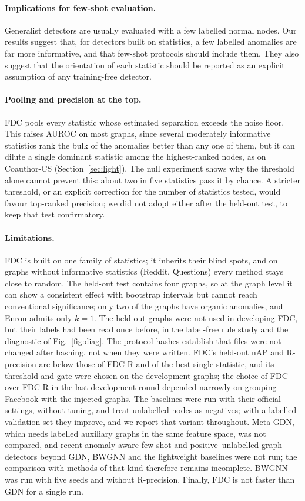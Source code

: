 \documentclass[pdflatex,sn-mathphys-ay]{sn-jnl}
\theoremstyle{plain}
\theoremstyle{remark}
\begin{document}
\paragraph{Implications for few-shot evaluation.} Generalist detectors are usually evaluated with a few labelled normal nodes. Our results suggest that, for detectors built on statistics, a few labelled anomalies are far more informative, and that few-shot protocols should include them. They also suggest that the orientation of each statistic should be reported as an explicit assumption of any training-free detector.

\paragraph{Pooling and precision at the top.} FDC pools every statistic whose estimated separation exceeds the noise floor. This raises AUROC on most graphs, since several moderately informative statistics rank the bulk of the anomalies better than any one of them, but it can dilute a single dominant statistic among the highest-ranked nodes, as on Coauthor-CS (Section~\ref{sec:light}). The null experiment shows why the threshold alone cannot prevent this: about two in five statistics pass it by chance. A stricter threshold, or an explicit correction for the number of statistics tested, would favour top-ranked precision; we did not adopt either after the held-out test, to keep that test confirmatory.

\paragraph{Limitations.} FDC is built on one family of statistics; it inherits their blind spots, and on graphs without informative statistics (Reddit, Questions) every method stays close to random. The held-out test contains four graphs, so at the graph level it can show a consistent effect with bootstrap intervals but cannot reach conventional significance; only two of the graphs have organic anomalies, and Enron admits only $k=1$. The held-out graphs were not used in developing FDC, but their labels had been read once before, in the label-free rule study and the diagnostic of Fig.~\ref{fig:diag}. The protocol hashes establish that files were not changed after hashing, not when they were written. FDC's held-out nAP and R-precision are below those of FDC-R and of the best single statistic, and its threshold and gate were chosen on the development graphs; the choice of FDC over FDC-R in the last development round depended narrowly on grouping Facebook with the injected graphs. The baselines were run with their official settings, without tuning, and treat unlabelled nodes as negatives; with a labelled validation set they improve, and we report that variant throughout. Meta-GDN, which needs labelled auxiliary graphs in the same feature space, was not compared, and recent anomaly-aware few-shot and positive--unlabelled graph detectors beyond GDN, BWGNN and the lightweight baselines were not run; the comparison with methods of that kind therefore remains incomplete. BWGNN was run with five seeds and without R-precision. Finally, FDC is not faster than GDN for a single run.
\end{document}
